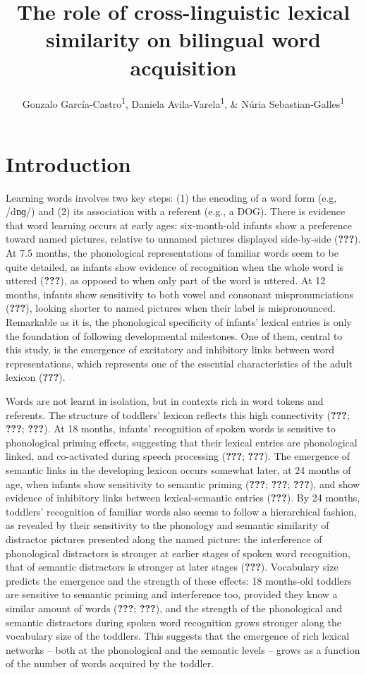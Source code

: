 \documentclass[
  english,
  man,man,floatsintext]{apa6}
\title{The role of cross-linguistic lexical similarity on bilingual word acquisition}
\author{Gonzalo García-Castro\textsuperscript{1}, Daniela Avila-Varela\textsuperscript{1}, \& Núria Sebastian-Galles\textsuperscript{1}}
\date{}
\affiliation{\vspace{0.5cm}\textsuperscript{1} Center for Brain and Cognition, Universitat Pompeu Fabra, Barcelona, Spain}
\begin{document}
\maketitle

\hypertarget{introduction}{%
\section{Introduction}\label{introduction}}

Learning words involves two key steps: (1) the encoding of a word form (e.g, /dɒɡ/)
and (2) its association with a referent (e.g., a DOG). There is evidence that word learning occurs at early ages: six-month-old infants show a preference toward named pictures, relative to unnamed pictures displayed side-by-side ({\textbf{???}}). At 7.5 months, the phonological representations of familiar words seem to be quite detailed, as infants show evidence of recognition when the whole word is uttered ({\textbf{???}}), as opposed to when only part of the word is uttered. At 12 months, infants show sensitivity to both vowel and consonant mispronunciations ({\textbf{???}}), looking shorter to named pictures when their label is mispronounced. Remarkable as it is, the phonological specificity of infants' lexical entries is only the foundation of following developmental milestones. One of them, central to this study, is the emergence of excitatory and inhibitory links between word representations, which represents one of the essential characteristics of the adult lexicon ({\textbf{???}}).

Words are not learnt in isolation, but in contexts rich in word tokens and referents. The structure of toddlers' lexicon reflects this high connectivity ({\textbf{???}}; {\textbf{???}}; {\textbf{???}}). At 18 months, infants' recognition of spoken words is sensitive to phonological priming effects, suggesting that their lexical entries are phonological linked, and co-activated during speech processing ({\textbf{???}}; {\textbf{???}}). The emergence of semantic links in the developing lexicon occurs somewhat later, at 24 months of age, when infants show sensitivity to semantic priming ({\textbf{???}}; {\textbf{???}}; {\textbf{???}}), and show evidence of inhibitory links between lexical-semantic entries ({\textbf{???}}). By 24 months, toddlers' recognition of familiar words also seems to follow a hierarchical fashion, as revealed by their sensitivity to the phonology and semantic similarity of distractor pictures presented along the named picture: the interference of phonological distractors is stronger at earlier stages of spoken word recognition, that of semantic distractors is stronger at later stages ({\textbf{???}}). Vocabulary size predicts the emergence and the strength of these effects: 18 months-old toddlers are sensitive to semantic priming and interference too, provided they know a similar amount of words ({\textbf{???}}; {\textbf{???}}), and the strength of the phonological and semantic distractors during spoken word recognition grows stronger along the vocabulary size of the toddlers. This suggests that the emergence of rich lexical networks -- both at the phonological and the semantic levels -- grows as a function of the number of words acquired by the toddler.
\end{document}
